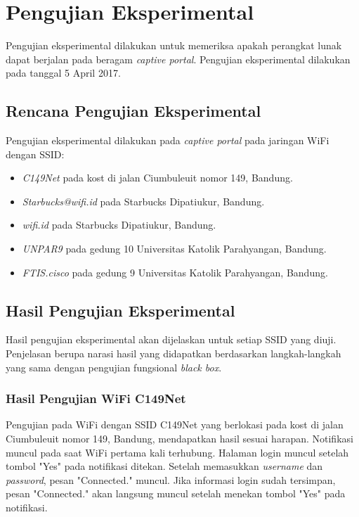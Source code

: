 \section{Pengujian Eksperimental}
\label{sec:pengujian_eksperimental}

Pengujian eksperimental dilakukan untuk memeriksa apakah perangkat lunak dapat berjalan pada beragam \textit{captive portal}. Pengujian eksperimental dilakukan pada tanggal 5 April 2017.

\subsection{Rencana Pengujian Eksperimental}
\label{subsec:rencana_pengujian_eksperimental}

Pengujian eksperimental dilakukan pada \textit{captive portal} pada jaringan WiFi dengan SSID:

\begin{itemize}
    \item{\textit{C149Net} pada kost di jalan Ciumbuleuit nomor 149, Bandung.}
    \item{\textit{Starbucks@wifi.id} pada Starbucks Dipatiukur, Bandung.}
    \item{\textit{wifi.id} pada Starbucks Dipatiukur, Bandung.}
    \item{\textit{UNPAR9} pada gedung 10 Universitas Katolik Parahyangan, Bandung.}
    \item{\textit{FTIS.cisco} pada gedung 9 Universitas Katolik Parahyangan, Bandung.}
\end{itemize}

\subsection{Hasil Pengujian Eksperimental}
\label{subsec:hasil_pengujian_eksperimental}

Hasil pengujian eksperimental akan dijelaskan untuk setiap SSID yang diuji. Penjelasan berupa narasi hasil yang didapatkan berdasarkan langkah-langkah yang sama dengan pengujian fungsional \textit{black box}.

\subsubsection{Hasil Pengujian WiFi C149Net}
\label{subsubsec:C149Net}

Pengujian pada WiFi dengan SSID C149Net yang berlokasi pada kost di jalan Ciumbuleuit nomor 149, Bandung, mendapatkan hasil sesuai harapan. Notifikasi muncul pada saat WiFi pertama kali terhubung. Halaman login muncul setelah tombol "Yes" pada notifikasi ditekan. Setelah memasukkan \textit{username} dan \textit{password}, pesan "Connected." muncul. Jika informasi login sudah tersimpan, pesan "Connected." akan langsung muncul setelah menekan tombol "Yes" pada notifikasi.

